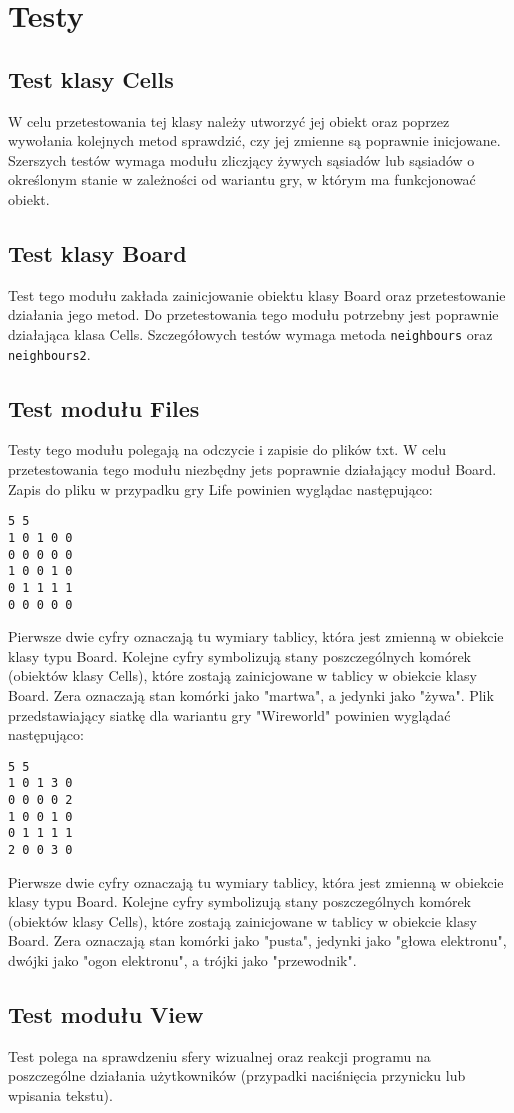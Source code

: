 \documentclass[10pt, oneside]{article}
\begin{document}
\section {Testy}
\subsection {Test klasy Cells}
W celu przetestowania tej klasy należy utworzyć jej obiekt oraz poprzez wywołania kolejnych metod sprawdzić, czy jej zmienne są poprawnie inicjowane. Szerszych testów wymaga modułu zliczjący żywych sąsiadów lub sąsiadów o określonym stanie w zależności od wariantu gry, w którym ma funkcjonować obiekt.
\subsection{Test klasy Board}
Test tego modułu zakłada zainicjowanie obiektu klasy Board oraz przetestowanie działania jego metod. Do przetestowania tego modułu potrzebny jest poprawnie działająca klasa Cells. Szczegółowych testów wymaga metoda \texttt{neighbours} oraz \texttt{neighbours2}.
\subsection {Test modułu Files}
Testy tego modułu polegają na odczycie i zapisie do plików txt. W celu przetestowania tego modułu niezbędny jets poprawnie działający moduł Board. Zapis do pliku w przypadku gry Life powinien wyglądac następująco:
\begin {verbatim}
5 5 
1 0 1 0 0
0 0 0 0 0
1 0 0 1 0
0 1 1 1 1
0 0 0 0 0 
\end{verbatim}
Pierwsze dwie cyfry oznaczają tu wymiary tablicy, która jest zmienną w obiekcie klasy typu Board. Kolejne cyfry symbolizują stany poszczególnych komórek (obiektów klasy Cells), które zostają zainicjowane w tablicy w obiekcie klasy Board. Zera oznaczają stan komórki jako "martwa", a jedynki jako "żywa".
Plik przedstawiający siatkę dla wariantu gry "Wireworld" powinien wyglądać następująco:
\begin {verbatim}
5 5 
1 0 1 3 0
0 0 0 0 2
1 0 0 1 0
0 1 1 1 1
2 0 0 3 0 
\end{verbatim}
Pierwsze dwie cyfry oznaczają tu wymiary tablicy, która jest zmienną w obiekcie klasy typu Board. Kolejne cyfry symbolizują stany poszczególnych komórek (obiektów klasy Cells), które zostają zainicjowane w tablicy w obiekcie klasy Board. Zera oznaczają stan komórki jako "pusta",  jedynki jako "głowa elektronu", dwójki jako "ogon elektronu", a trójki jako "przewodnik".

\subsection {Test modułu View}
Test polega na sprawdzeniu sfery wizualnej oraz reakcji programu na poszczególne działania użytkowników (przypadki naciśnięcia przynicku lub wpisania tekstu).
\end{document}
